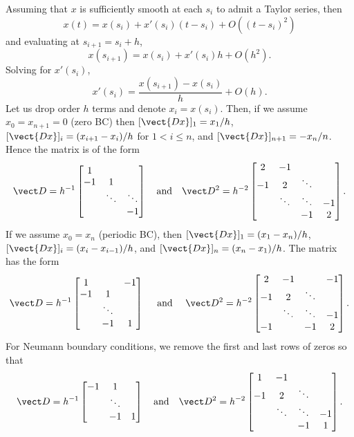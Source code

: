 \documentclass{homework}
\begin{document}
\begin{solution}
Assuming that $x$ is sufficiently smooth at each $s_i$ to admit a Taylor series, then
$$
  x(t) = x(s_i) + x'(s_i)(t - s_i) + O\left((t-s_i)^2\right)
$$
and evaluating at $s_{i+1} = s_i+h$,
$$
  x(s_{i+1}) = x(s_i) + x'(s_i)h + O(h^2).
$$
Solving for $x'(s_i)$,
$$
  x'(s_i) = \frac{x(s_{i+1}) - x(s_i)}{h} + O(h).
$$
Let us drop order $h$ terms and denote $x_i = x(s_i)$. Then, if we assume $x_0 = x_{n+1} =
0$ (zero BC) then $[\vect{D x}]_1 = x_1/h$, $[\vect{Dx}]_i = (x_{i+1} -
x_i)/h$ for $1<i\le n$, and $[\vect{Dx}]_{n+1}=-x_n/n$. Hence the matrix is of the form
$$
  \vect D = h^{-1}\begin{bmatrix}
  1      &        &        \\
  -1     & 1      &        \\
         & \ddots & \ddots \\
         &        & -1
  \end{bmatrix}
  \quad\text{and}\quad
  \vect D^2 = h^{-2}\begin{bmatrix}
  2      & -1     &        &    \\
  -1     & 2      & \ddots &    \\
         & \ddots & \ddots & -1 \\
         &        & -1     & 2
  \end{bmatrix}.
$$
If we assume $x_0 = x_n$ (periodic BC), then $[\vect{Dx}]_1 = (x_1 - x_n)/h$,
$[\vect{Dx}]_i = (x_i - x_{i-1})/h$, and $[\vect{Dx}]_n = (x_n - x_1)/h$. The matrix has the form
$$
  \vect D = h^{-1} \begin{bmatrix} 
  1      &        &   -1   \\
  -1     & 1      &        \\
         & \ddots &        \\
         & -1     & 1
  \end{bmatrix}
  \quad\text{ and }\quad
  \vect D^2 = h^{-2}\begin{bmatrix}
  2      & -1     &        & -1 \\
  -1     & 2      & \ddots &    \\
         & \ddots & \ddots & -1 \\
  -1     &        & -1     & 2
  \end{bmatrix}.
$$
For Neumann boundary conditions, we remove the first and last rows of zeros so that
$$
  \vect D = h^{-1} \begin{bmatrix} 
  -1     & 1      &        \\
         & \ddots &        \\
         & -1     & 1
  \end{bmatrix}
  \quad\text{and}\quad
  \vect D^2 = h^{-2}\begin{bmatrix}
  1      & -1     &        &    \\
  -1     & 2      & \ddots &    \\
         & \ddots & \ddots & -1 \\
         &        & -1     & 1
  \end{bmatrix}.
$$
\end{solution}
\newpage
\end{document}
